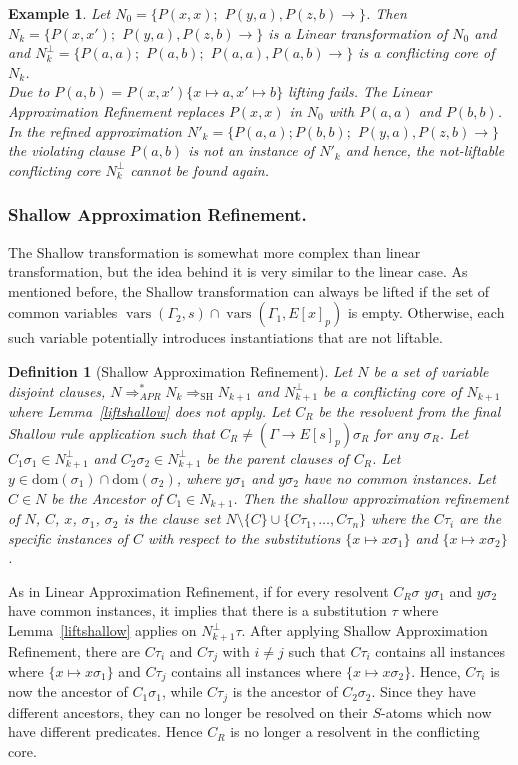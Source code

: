 \documentclass{llncs}
\newcommand{\imp}{\rightarrow}
\newcommand{\apr}{ \Rightarrow_{APR}}
\newtheorem{defin}{Definition}
\newtheorem{exmp}{Example}
\newcommand{\vars}{\operatorname{vars}}
\begin{document}
\begin{exmp}\label{LinAbsEx}
Let $N_0 = \{ P(x,x);$ $P(y,a),P(z,b) \imp \}$. 
Then $N_k=  \{ P(x,x');$ $P(y,a),P(z,b) \imp \}$ is a Linear transformation of $N_0 $ and
and $N^\bot_k=\{ P(a,a);$ $P(a,b);$ $P(a,a),P(a,b)\imp\}$ is a conflicting core of $N_k$.\\
Due to $P(a,b)= P(x,x')\{x\mapsto a, x' \mapsto b\}$ lifting fails.
The Linear Approximation Refinement replaces $P(x,x)$ in $N_0$ with $P(a,a)$ and $P(b,b)$.
In the refined approximation $N'_k = \{ P(a,a);P(b,b);$ $P(y,a),P(z,b)\imp\}$
the violating clause $P(a,b)$ is not an instance of $N'_k$ and hence, the not-liftable conflicting core $N^\bot_k$ cannot be found again.
\end{exmp} 

\subsubsection{Shallow Approximation Refinement.}
The Shallow transformation is somewhat more complex than linear transformation, 
but the idea behind it is very similar to the linear case.
As mentioned before, the Shallow transformation can always be lifted 
if the set of common variables
$\vars(\Gamma_2,s) \cap \vars(\Gamma_1,E[x]_p)$ is empty. 
Otherwise, each such variable potentially 
introduces instantiations that are not liftable.

\begin{defin}[Shallow Approximation Refinement]
Let $N$ be a set of variable disjoint clauses, 
$N\apr^* N_k \Rightarrow_{\text{SH}} N_{k+1}$ and
$N^\bot_{k+1}$ be a conflicting core of $N_{k+1}$ where Lemma~\ref{liftshallow} does not apply.
Let $C_R$ be the resolvent from the final Shallow rule application such that $C_R \neq (\Gamma \imp E[s]_{p})\sigma_R$ for any $\sigma_R$. 
Let $C_1\sigma_1 \in N^\bot_{k+1}$ and $C_2\sigma_2 \in N^\bot_{k+1}$ be the parent clauses of $C_R$.
Let $y \in \text{dom}(\sigma_1) \cap \text{dom}(\sigma_2)$, where $y\sigma_1$ and $ y\sigma_2$ have no common instances. 
Let $C\in N$ be the Ancestor of $C_1\in N_{k+1}$.
Then the \emph{shallow approximation refinement} of $N$, $C$, $x$, $\sigma_1$, $\sigma_2$ is the clause
set $N\setminus\{C\}\cup\{C\tau_1,\ldots,C\tau_n\}$ where the $C\tau_i$ are the specific
instances of $C$ with respect to the substitutions $\{x\mapsto x\sigma_1\}$ and
$\{x\mapsto x\sigma_2\}$.
\end{defin}

As in Linear Approximation Refinement, if for every resolvent $C_R\sigma$  $y\sigma_1$ and $ y\sigma_2$ have common instances, it implies that there is a substitution $\tau$
where Lemma~\ref{liftshallow} applies on $N^\bot_{k+1}\tau$.
After applying Shallow Approximation Refinement, there are $C\tau_i$ and $ C\tau_j$ with $i\neq j$ such that  $C\tau_i$ contains all instances where $\{x \mapsto x\sigma_1\} $
and $C\tau_j$ contains all instances where $\{x \mapsto x\sigma_2\}$. 
Hence, $C\tau_i$ is now the ancestor of $C_1\sigma_1$, while $C\tau_j$ is the ancestor of $C_2\sigma_2$.
Since they have different ancestors, they can no longer be resolved on their $S$-atoms which now have different predicates.
Hence $C_R$ is no longer a resolvent in the conflicting  core.  
\end{document}
